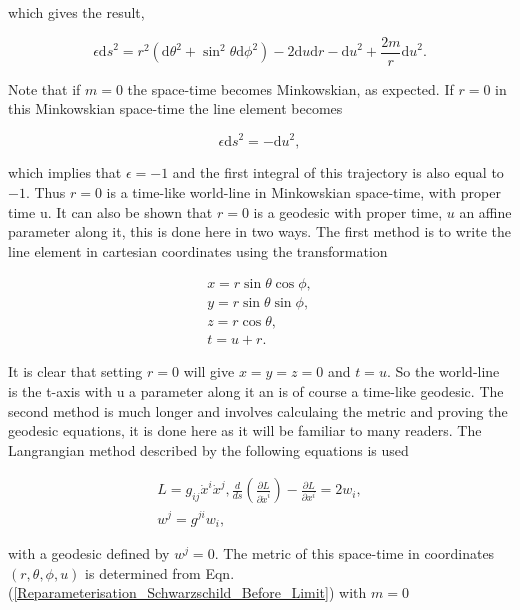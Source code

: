 \noindent which gives the result,

\begin{equation}\label{Reparameterisation_Schwarzschild_Before_Limit}
\epsilon {\mathrm{d}s}^{2} = r^2 ({\mathrm{d}\theta}^2 + {{\sin}^2 \theta}{\mathrm{d} \phi}^2) - 2 \mathrm{d}u \mathrm{d}r - {\mathrm{d}u}^{2} + \frac{2m}{r} {\mathrm{d}u}^{2}. 
\end{equation}

Note that if $m = 0$ the space-time becomes Minkowskian, as expected. If $r = 0$ in this Minkowskian space-time the line element becomes

$$ \epsilon {\mathrm{d}s}^2 = - {\mathrm{d}u}^{2},$$

\noindent which implies that $\epsilon = -1$ and the first integral of this trajectory is also equal to $-1$. Thus $r = 0$ is a time-like world-line in Minkowskian space-time, with proper time u. It can also be shown that $r=0$ is a geodesic with proper time, $u$ an affine parameter along it, this is done here in two ways. The first method is to write the line element in cartesian coordinates using the transformation

\begin{gather*} 
x = r\sin{\theta}\cos{\phi}, \\
y = r\sin{\theta}\sin{\phi}, \\
z = r\cos{\theta}, \\
t = u + r.
\end{gather*}

\noindent It is clear that setting $r=0$ will give $x = y = z = 0$ and $t = u$. So the world-line is the t-axis with u a parameter along it an is of course a time-like geodesic. The second method is much longer and involves calculaing the metric and proving the geodesic equations, it is done here as it will be familiar to many readers. The Langrangian method described by the following equations is used

\begin{gather*}
L = g_{ij} \dot{x}^{i}\dot{x}^{j},
\frac{d}{ds}\left( \frac{\partial L}{\partial \dot{x}^{i}}\right) - \frac{\partial L}{\partial {x}^{i}} = 2 w_{i}, \\
w^{j} = g^{ji}w_{i},  
\end{gather*}

\noindent with a geodesic defined by $w^{j} = 0$. The metric of this space-time in coordinates $(r ,\theta, \phi, u)$ is determined from Eqn.(\ref{Reparameterisation_Schwarzschild_Before_Limit}) with $m=0$


